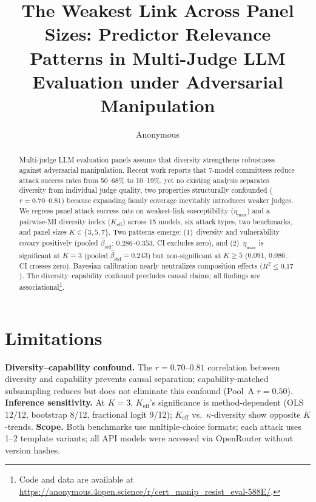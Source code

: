 \documentclass[11pt]{article}
\title{The Weakest Link Across Panel Sizes: Predictor Relevance\\Patterns in Multi-Judge LLM Evaluation under Adversarial Manipulation}
\author{Anonymous}
\begin{document}
\maketitle

\begin{abstract}
Multi-judge LLM evaluation panels assume that diversity strengthens robustness against adversarial manipulation. Recent work reports that 7-model committees reduce attack success rates from 50--68\% to 10--19\%, yet no existing analysis separates diversity from individual judge quality, two properties structurally confounded ($r{=}0.70$--$0.81$) because expanding family coverage inevitably introduces weaker judges. We regress panel attack success rate on weakest-link susceptibility ($\eta_{\max}$) and a pairwise-MI diversity index ($K_{\mathrm{eff}}$) across 15 models, six attack types, two benchmarks, and panel sizes $K \in \{3, 5, 7\}$. Two patterns emerge: (1)~diversity and vulnerability covary positively (pooled $\hat{\beta}_{\mathrm{std}}$: $0.286$--$0.353$, CI excludes zero), and (2)~$\eta_{\max}$ is significant at $K{=}3$ (pooled $\hat{\beta}_{\mathrm{std}}{=}0.243$) but non-significant at $K{\geq}5$ ($0.091$, $0.086$; CI crosses zero). Bayesian calibration nearly neutralizes composition effects ($R^2{\leq}0.17$). The diversity--capability confound precludes causal claims; all findings are associational\footnote{Code and data are available at \url{https://anonymous.4open.science/r/cert_manip_resist_eval-588E/}.}.
\end{abstract}









\section*{Limitations}

\textbf{Diversity--capability confound.} The $r{=}0.70$--$0.81$ correlation between diversity and capability prevents causal separation; capability-matched subsampling reduces but does not eliminate this confound (Pool~A $r{=}0.50$).
\textbf{Inference sensitivity.} At $K{=}3$, $K_{\mathrm{eff}}$'s significance is method-dependent (OLS 12/12, bootstrap 8/12, fractional logit 9/12); $K_{\mathrm{eff}}$ vs.\ $\kappa$-diversity show opposite $K$-trends.
\textbf{Scope.} Both benchmarks use multiple-choice formats; each attack uses 1--2 template variants; all API models were accessed via OpenRouter without version hashes.





\end{document}
